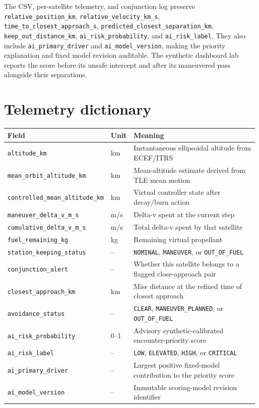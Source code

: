 \documentclass[11pt,a4paper]{article}
\begin{document}
The CSV, per-satellite telemetry, and conjunction log preserve \texttt{relative\_position\_km}, \texttt{relative\_velocity\_km\_s}, \texttt{time\_to\_closest\_approach\_s}, \texttt{predicted\_closest\_separation\_km}, \texttt{keep\_out\_distance\_km}, \texttt{ai\_risk\_probability}, and \texttt{ai\_risk\_label}. They also include \texttt{ai\_primary\_driver} and \texttt{ai\_model\_version}, making the priority explanation and fixed model revision auditable. The synthetic dashboard lab reports the score before its unsafe intercept and after its maneuvered pass alongside their separations.

\section{Telemetry dictionary}
\begin{center}
\begin{tabular}{lll}
\toprule
Field & Unit & Meaning \\
\midrule
\texttt{altitude\_km} & km & Instantaneous ellipsoidal altitude from ECEF/ITRS \\
\texttt{mean\_orbit\_altitude\_km} & km & Mean-altitude estimate derived from TLE mean motion \\
\texttt{controlled\_mean\_altitude\_km} & km & Virtual controller state after decay/burn action \\
\texttt{maneuver\_delta\_v\_m\_s} & m/s & Delta-v spent at the current step \\
\texttt{cumulative\_delta\_v\_m\_s} & m/s & Total delta-v spent by that satellite \\
\texttt{fuel\_remaining\_kg} & kg & Remaining virtual propellant \\
\texttt{station\_keeping\_status} & -- & \texttt{NOMINAL}, \texttt{MANEUVER}, or \texttt{OUT\_OF\_FUEL} \\
\texttt{conjunction\_alert} & -- & Whether this satellite belongs to a flagged close-approach pair \\
\texttt{closest\_approach\_km} & km & Miss distance at the refined time of closest approach \\
\texttt{avoidance\_status} & -- & \texttt{CLEAR}, \texttt{MANEUVER\_PLANNED}, or \texttt{OUT\_OF\_FUEL} \\
\texttt{ai\_risk\_probability} & 0--1 & Advisory synthetic-calibrated encounter-priority score \\
\texttt{ai\_risk\_label} & -- & \texttt{LOW}, \texttt{ELEVATED}, \texttt{HIGH}, or \texttt{CRITICAL} \\
\texttt{ai\_primary\_driver} & -- & Largest positive fixed-model contribution to the priority score \\
\texttt{ai\_model\_version} & -- & Immutable scoring-model revision identifier \\
\bottomrule
\end{tabular}
\end{center}
\end{document}
